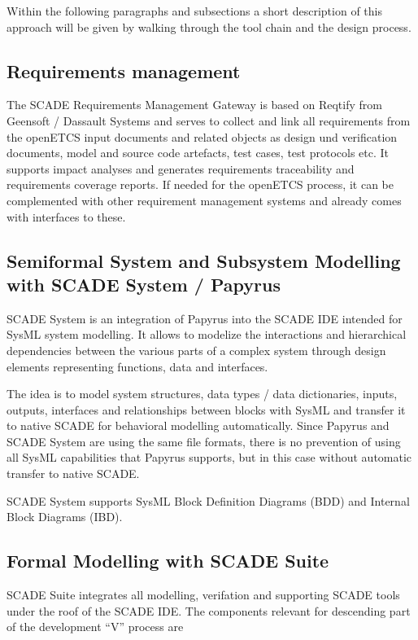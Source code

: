 Within the following paragraphs and subsections a short description of this approach will be given by walking through the tool chain and the design process. 

\subsection{Requirements management}
\label{sec:RequirementsManagement}

The SCADE Requirements Management Gateway is based on Reqtify from Geensoft / Dassault Systems and serves to collect and link all requirements from the openETCS input documents and related objects as design und verification documents, model and source code artefacts, test cases, test protocols etc. It supports impact analyses and generates requirements traceability and requirements coverage reports. 
If needed for the openETCS process, it can be complemented with other requirement management systems and already comes with interfaces to these. 


\subsection{Semiformal System and Subsystem Modelling with SCADE System / Papyrus}
\label{sec:SemiformalModelling}

SCADE System is an integration of Papyrus into the SCADE IDE intended for SysML system modelling. It allows to modelize the interactions and hierarchical dependencies between the various parts of a complex system through design elements representing functions, data and interfaces. 
 
The idea is to model system structures, data types / data dictionaries, inputs, outputs, interfaces and relationships between blocks with SysML and transfer it to native SCADE for behavioral modelling automatically. Since Papyrus and SCADE System are using the same file formats, there is no prevention of using all SysML capabilities that Papyrus supports, but in this case without automatic transfer to native SCADE. 

SCADE System supports SysML Block Definition Diagrams (BDD) and	Internal Block Diagrams (IBD).


\subsection{Formal Modelling with SCADE Suite}
\label{sec:FormalModellingwithSCADESuite}

SCADE Suite integrates all modelling, verifation and supporting SCADE tools under the roof of the SCADE IDE. The components relevant for descending part of the development "`V"' process are

